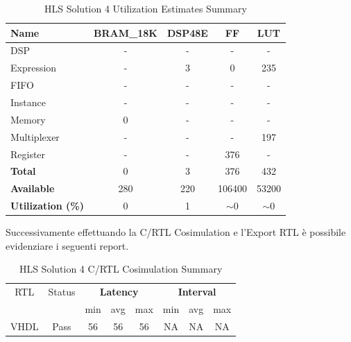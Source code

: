 \begin{table}[H]
	\centering
	\begin{tabular}{|l|c|c|c|c|}
		\hline
		\textbf{Name}    & \textbf{BRAM\_18K} & \textbf{DSP48E} & \textbf{FF} & \textbf{LUT} \\ \hline
		DSP              & -                   & -               & -           & -            \\ 
		Expression       & -                   & 3               & 0           & 235          \\ 
		FIFO             & -                   & -               & -           & -            \\ 
		Instance         & -                   & -               & -           & -            \\ 
		Memory           & 0                   & -               & -          & -            \\ 
		Multiplexer      & -                   & -               & -           & 197          \\ 
		Register         & -                   & -               & 376         & -            \\ \hline
		\textbf{Total}   & 0                   & 3               & 376         & 432          \\ \hline
		\textbf{Available} & 280               & 220             & 106400      & 53200        \\ \hline
		\textbf{Utilization (\%)} & 0            & 1               & $\sim$0     & $\sim$0      \\ \hline
	\end{tabular}
	\caption{HLS Solution 4 Utilization Estimates Summary}
	\label{tab:hls-solution-4-utilization-estimates-summary}
\end{table}

Successivamente effettuando la C/RTL Cosimulation e l'Export RTL è possibile evidenziare i seguenti report.

\begin{table}[H]
	\centering
	\begin{tabular}{|c|c|c|c|c|c|c|c|}
		\hline
		\multicolumn{1}{|c|}{RTL} & \multicolumn{1}{|c|}{Status} & \multicolumn{3}{c|}{\textbf{Latency}} & \multicolumn{3}{c|}{\textbf{Interval}} \\
		&  & min & avg & max & min & avg & max \\
		\hline
		VHDL & Pass & 56 & 56 & 56 & NA & NA & NA \\
		\hline
	\end{tabular}
	\caption{HLS Solution 4 C/RTL Cosimulation Summary }
	\label{tab:hls-solution-4-cosimulation-summary}
\end{table}

